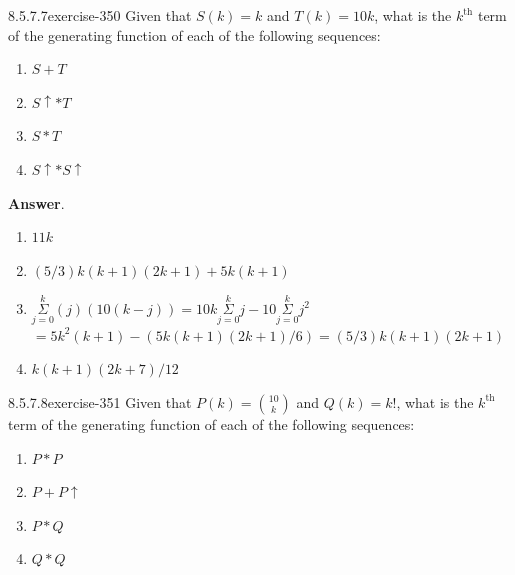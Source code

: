 \documentclass[twoside,10pt,]{book}
\numberwithin{equation}{section}
\begin{document}
\begin{divisionsolution}{8.5.7.7}{}{exercise-350}%
\hypertarget{p-2995}{}%
Given that \(S(k) = k\) and \(T(k) = 10k\), what is the \(k^{\text{th}}\) term of the generating function of each of the following sequences:%
\par
\hypertarget{p-2996}{}%
\leavevmode%
\begin{enumerate}[label=(\alph*)]
\item\hypertarget{li-1467}{}\hypertarget{p-2997}{}%
\(S + T\)%
\item\hypertarget{li-1468}{}\hypertarget{p-2998}{}%
\(S\uparrow  * T\)%
\item\hypertarget{li-1469}{}\hypertarget{p-2999}{}%
\(S * T\)%
\item\hypertarget{li-1470}{}\hypertarget{p-3000}{}%
\(S\uparrow *S\uparrow\)%
\end{enumerate}
%
\par\smallskip%
\noindent\textbf{Answer}.\quad%
\hypertarget{p-3001}{}%
\leavevmode%
\begin{enumerate}[label=(\alph*)]
\item\hypertarget{li-1471}{}\hypertarget{p-3002}{}%
\(11k\)%
\item\hypertarget{li-1472}{}\hypertarget{p-3003}{}%
\((5/3)k(k+1)(2k+1)+5k(k+1)\)%
\item\hypertarget{li-1473}{}\(\underset{j=0}{\overset{k}{\Sigma }}(j)(10(k-j))=10k\underset{j=0}{\overset{k}{\Sigma }}j-10\underset{j=0}{\overset{k}{\Sigma }}j^2\) \(=5k^2(k+1)-(5k(k+1)(2k+1)/6)
=(5/3)k(k+1)(2k+1)\)%
\item\hypertarget{li-1474}{}\hypertarget{p-3004}{}%
\(k(k+1)(2k+7)/12\)%
\end{enumerate}
%
\end{divisionsolution}%
\begin{divisionsolution}{8.5.7.8}{}{exercise-351}%
\hypertarget{p-3005}{}%
Given that \(P(k) = \binom{10}{k}\) and \(Q(k) = k!\), what is the \(k^{\text{th}}\) term of the generating function of each of the following sequences:%
\par
\hypertarget{p-3006}{}%
\leavevmode%
\begin{enumerate}[label=(\alph*)]
\item\hypertarget{li-1475}{}\hypertarget{p-3007}{}%
\(P * P\)%
\item\hypertarget{li-1476}{}\hypertarget{p-3008}{}%
\(P + P\uparrow\)%
\item\hypertarget{li-1477}{}\hypertarget{p-3009}{}%
\(P * Q\)%
\item\hypertarget{li-1478}{}\hypertarget{p-3010}{}%
\(Q * Q\)%
\end{enumerate}
%
\end{divisionsolution}%
\end{document}
